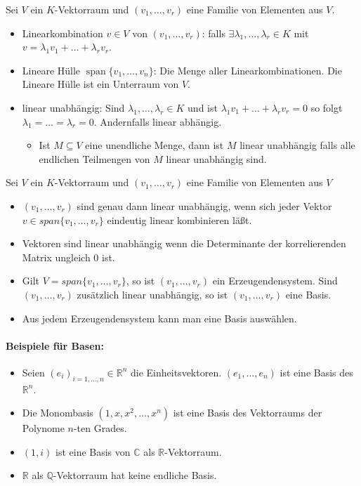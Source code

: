 \documentclass[a4paper,12pt,DIV15]{scrartcl}
\begin{document}
\begin{defn}
Sei $V$ ein $K$-Vektorraum und $(v_1,\dots ,v_r)$ eine Familie von
Elementen aus $V$.
\begin{itemize}
\item {\color{red} Linearkombination} $v \in V$ von $(v_1,\dots ,v_r)$: 
  falls $\exists \lambda_1, \dots, \lambda_r \in K$  mit
  $ v= \lambda_1 v_1 + \dots + \lambda_r v_r$. 
\item {\color{red} Lineare Hülle} $\mathop{span}\{v_1, \dots, v_n\}$: Die Menge aller Linearkombinationen. Die Lineare
  Hülle ist ein Unterraum von $V$.
\item {\color{red} linear unabhängig}: 
  Sind $\lambda_1, \dots , \lambda_r \in K$ und ist $\lambda_1 v_1 +
  \dots + \lambda_r v_r=0$ so folgt $\lambda_1= \dots =
  \lambda_r=0$. Andernfalls {\color{red} linear abhängig}. 
\begin{itemize}
\item Ist $M \subseteq V$ eine unendliche Menge, dann ist $M$ linear unabhängig falls alle endlichen Teilmengen von $M$ linear unabhängig sind.
\end{itemize}
\end{itemize}
\end{defn}

\begin{bemerk}
Sei $V$ ein $K$-Vektorraum und $(v_1,\dots ,v_r)$ eine Familie von
Elementen aus $V$
\begin{itemize}
\item $(v_1,\dots ,v_r)$ sind genau dann linear unabhängig, wenn sich
jeder Vektor $v \in span\{v_1, \dots ,v_r\}$ eindeutig linear kombinieren
läßt. 
\item Vektoren sind linear unabhängig wenn die Determinante der korrelierenden Matrix ungleich 0 ist.
\item Gilt $V=span\{v_1,\dots ,v_r \}$, so ist $(v_1, \dots ,v_r)$ ein
{\color{red} Erzeugendensystem}. Sind $(v_1, \dots ,v_r)$ zusätzlich linear
unabhängig, so ist $(v_1, \dots ,v_r)$ eine {\color{red} Basis}.
\item Aus jedem Erzeugendensystem kann man eine Basis auswählen. 
\end{itemize}
\end{bemerk}


\paragraph{Beispiele für Basen:}
\begin{itemize}
\item Seien $(e_i)_{i=1,\ldots,n} \in \mathbb{R}^n$ die Einheitsvektoren. $(e_1, \dots
,e_n)$ ist eine Basis des $\mathbb{R}^n$.
\item Die Monombasis $(1,x,x^2,\dots, x^n)$ ist eine Basis des
Vektorraums der Polynome $n$-ten Grades.
\item $(1,i)$ ist eine Basis von $\mathbb{C}$ als
$\mathbb{R}$-Vektorraum. 
\item $\mathbb{R}$ als $\mathbb{Q}$-Vektorraum hat keine endliche
Basis. 
\end{itemize}
\end{document}
